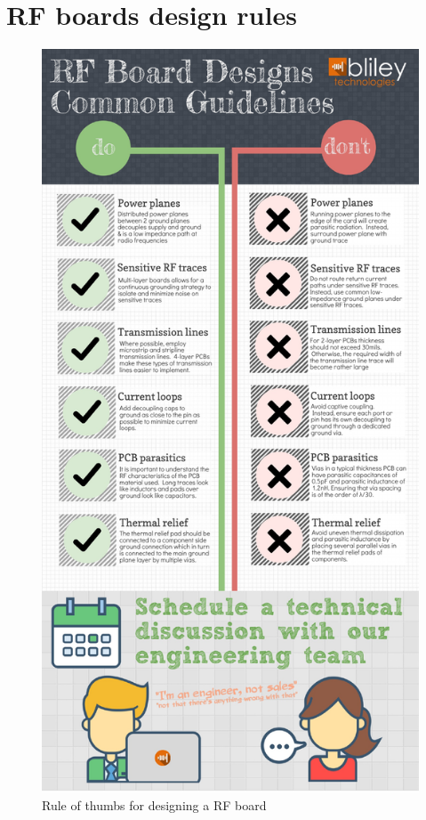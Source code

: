 \chapter{RF boards design rules}
\begin{figure}[h!]
\centering
\includegraphics[trim={0 11cm 0 0},clip,scale=0.65]{figures/rf-board-design-guidelines.pdf}
\caption{Rule of thumbs for designing a RF board\cite{PCBRules}}
\end{figure}